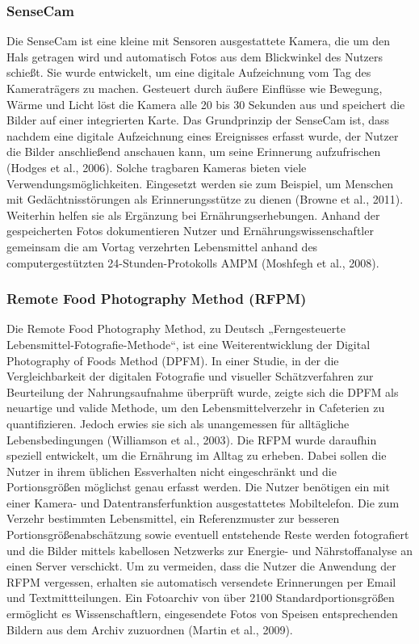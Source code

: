 \subsubsection{SenseCam}

Die SenseCam ist eine kleine mit Sensoren ausgestattete Kamera, die um den Hals getragen wird  und automatisch Fotos aus dem Blickwinkel des Nutzers schießt. Sie wurde entwickelt, um eine digitale Aufzeichnung vom Tag des Kameraträgers zu machen. Gesteuert durch äußere Einflüsse wie Bewegung, Wärme und Licht löst die Kamera alle 20 bis 30 Sekunden aus und speichert die Bilder auf einer integrierten Karte. Das Grundprinzip der SenseCam ist, dass nachdem eine digitale Aufzeichnung eines Ereignisses erfasst wurde, der Nutzer die Bilder anschließend anschauen kann, um seine Erinnerung aufzufrischen (Hodges et al., 2006). Solche tragbaren Kameras bieten viele Verwendungsmöglichkeiten. Eingesetzt werden sie zum Beispiel, um Menschen mit Gedächtnisstörungen als Erinnerungsstütze zu dienen (Browne et al., 2011). Weiterhin helfen sie als Ergänzung bei Ernährungserhebungen. Anhand der gespeicherten Fotos dokumentieren Nutzer und Ernährungswissenschaftler gemeinsam die am Vortag verzehrten Lebensmittel anhand des computergestützten 24-Stunden-Protokolls AMPM (Moshfegh et al., 2008).

\subsubsection{Remote Food Photography Method (RFPM)}

Die Remote Food  Photography Method, zu Deutsch „Ferngesteuerte Lebensmittel-Fotografie-Methode“, ist eine  Weiterentwicklung der Digital Photography of Foods Method (DPFM). In einer Studie, in der die Vergleichbarkeit der digitalen Fotografie und visueller Schätzverfahren zur Beurteilung der Nahrungsaufnahme überprüft wurde, zeigte sich die DPFM als neuartige und valide Methode, um den Lebensmittelverzehr in Cafeterien zu quantifizieren. Jedoch erwies sie sich als  unangemessen für alltägliche Lebensbedingungen (Williamson et al., 2003). Die RFPM wurde daraufhin speziell entwickelt, um die Ernährung im Alltag zu erheben. Dabei sollen die Nutzer in ihrem üblichen Essverhalten nicht eingeschränkt und die Portionsgrößen möglichst genau erfasst werden. Die Nutzer benötigen ein mit einer Kamera- und Datentransferfunktion ausgestattetes Mobiltelefon. Die zum Verzehr bestimmten Lebensmittel, ein Referenzmuster zur besseren Portionsgrößenabschätzung sowie eventuell entstehende Reste werden fotografiert und die Bilder mittels kabellosen Netzwerks zur Energie- und Nährstoffanalyse an einen Server verschickt. Um zu vermeiden, dass die Nutzer die Anwendung der RFPM vergessen, erhalten sie automatisch versendete Erinnerungen per Email und Textmittteilungen.  
Ein Fotoarchiv von über 2100 Standardportionsgrößen ermöglicht es Wissenschaftlern, eingesendete Fotos von Speisen entsprechenden Bildern aus dem Archiv zuzuordnen (Martin et al., 2009).





